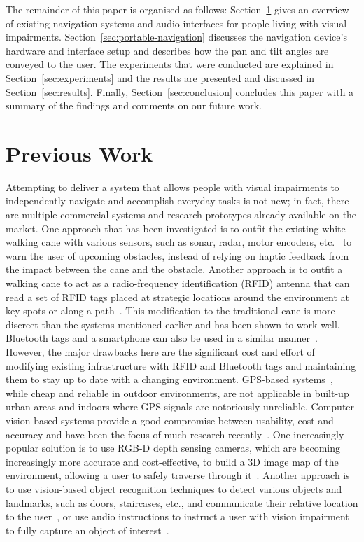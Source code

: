 \documentclass[sigconf, review=true, screen=true, anonymous=true]{acmart}
\begin{document}
The remainder of this paper is organised as follows: Section~\ref{sec:lit-review} gives an overview of existing navigation systems and audio interfaces for people living with visual impairments. Section~\ref{sec:portable-navigation} discusses the navigation device's hardware and interface setup and describes how the pan and tilt angles are conveyed to the user. The experiments that were conducted are explained in Section~\ref{sec:experiments} and the results are presented and discussed in Section~\ref{sec:results}. Finally, Section~\ref{sec:conclusion} concludes this paper with a summary of the findings and comments on our future work. 

\section{Previous Work}
\label{sec:lit-review}

Attempting to deliver a system that allows people with visual impairments to independently navigate and accomplish everyday tasks is not new; in fact, there are multiple commercial systems and research prototypes already available on the market.
One approach that has been investigated is to outfit the existing white walking cane with various sensors,
such as sonar, radar, motor encoders, etc.~\cite{ulrich1997, marion2008batcane} to warn the user of upcoming obstacles, instead of relying on haptic feedback from the impact between the cane and the obstacle.
Another approach is to outfit a walking cane to act as a radio-frequency identification (RFID) antenna that can read a set of RFID tags placed at strategic locations around the environment at key spots or along a path~\cite{faria2010electronic, willis2005}.
This modification to the traditional cane is more discreet than the systems mentioned earlier and has been shown to work well.
Bluetooth tags and a smartphone can also be used in a similar manner~\cite{sato2017navcog3}.
However, the major drawbacks here are the significant cost and effort of modifying existing infrastructure with RFID and Bluetooth tags and maintaining them to stay up to date with a changing environment.
GPS-based systems~\cite{ran2004drishti, loomis2001navigating, kammoun2012navigation}, while cheap and reliable in outdoor environments, are not applicable in built-up urban areas and indoors where GPS signals are notoriously unreliable.
Computer vision-based systems provide a good compromise between usability, cost and accuracy and have been the focus of much research recently~\cite{manduchi2014last}.
One increasingly popular solution is to use RGB-D depth sensing cameras, which are becoming increasingly more accurate and cost-effective, to build a 3D image map of the environment, allowing a user to safely traverse through it~\cite{lee2015, rodriguez2012obstacle}.
Another approach is to use vision-based object recognition techniques to detect various objects and landmarks, such as doors, staircases, etc., and communicate their relative location to the user~\cite{schauerte2012assistive, tian2013b, fiannaca2014headlock}, or use audio instructions to instruct a user with vision impairment to fully capture an object of interest~\cite{vazquez2012helping}. 
\end{document}

